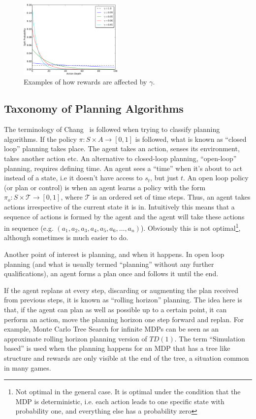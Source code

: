 \documentclass[conference]{IEEEtran}
\begin{document}
\begin{figure}[ht]
  \centering
  \includegraphics[width=0.45\textwidth]{graphics/gamma-crop.pdf}
  \caption{Examples of how rewards are affected by $\gamma$.}
  \label{fig:gamma}
\end{figure}


\subsection{Taxonomy of Planning Algorithms}
The terminology of Chang~\cite{chang2007simulation} is followed when trying to classify planning algorithms. If the policy $\pi:S \times A \rightarrow [0,1]$ is followed, what is known as ``closed loop'' planning takes place. The agent takes an action, senses its environment, takes another action etc. An alternative to closed-loop planning, ``open-loop'' planning, requires defining time. An agent sees a ``time'' when it's about to act instead of a state, i.e it doesn't have access to $s_t$, but just $t$. An open loop policy (or plan or control) is when an agent learns a policy with the form $\pi_o:S \times \mathcal{T} \rightarrow [0,1]$, where  $\mathcal{T}$ is an ordered set of time steps. Thus, an agent takes actions irrespective of the current state it is in. Intuitively this means that a sequence of actions is formed by the agent and the agent will take these actions in sequence (e.g. $(a_1,a_2,a_3,a_4,a_5,a_6,\dots,a_n)$). Obviously this is not optimal\footnote{Not optimal in the general case. It is optimal under the condition that the MDP is deterministic, i.e. each action leads to one specific state with probability one, and everything else has a probability zero}, although sometimes is much easier to do.


Another point of interest is planning, and when it happens. In open loop planning (and what is usually termed ``planning'' without any further qualifications), an agent forms a plan once and follows it until the end.

If the agent replans at every step, discarding or augmenting the plan received from previous steps, it is known as ``rolling horizon'' planning. The idea here is that, if the agent can plan as well as possible up to a  certain point, it can perform an action, move the planning horizon one step forward and replan. For example, Monte Carlo Tree Search for infinite MDPs can be seen as an approximate rolling horizon planning version of $TD(1)$\cite{silver2009reinforcement}.  The term ``Simulation based'' is used when the planning happens for an MDP that has a tree like structure and rewards are only visible at the end of the tree, a situation common in many games.
\end{document}
